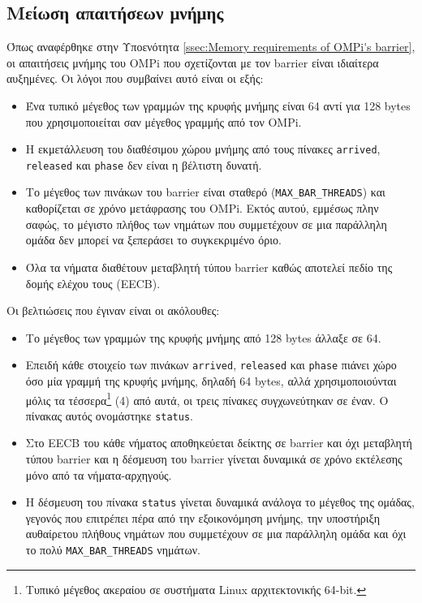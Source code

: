 \subsection{Μείωση απαιτήσεων μνήμης}
Όπως αναφέρθηκε στην Υποενότητα \ref{ssec:Memory requirements of OMPi's barrier}, οι απαιτήσεις μνήμης του OMPi που σχετίζονται με τον barrier είναι ιδιαίτερα αυξημένες. Οι λόγοι που συμβαίνει αυτό είναι οι εξής:
\begin{itemize}
	\item Ένα τυπικό μέγεθος των γραμμών της κρυφής μνήμης είναι 64 αντί για 128 bytes που χρησιμοποιείται σαν μέγεθος γραμμής από τον OMPi.
	\item Η εκμετάλλευση του διαθέσιμου χώρου μνήμης από τους πίνακες \texttt{arrived}, \texttt{released} και \texttt{phase} δεν είναι η βέλτιστη δυνατή.
	\item Το μέγεθος των πινάκων του barrier είναι σταθερό (\texttt{MAX\_BAR\_THREADS}) και καθορίζεται σε χρόνο μετάφρασης του OMPi. Εκτός αυτού, εμμέσως πλην σαφώς, το μέγιστο πλήθος των νημάτων που συμμετέχουν σε μια παράλληλη ομάδα δεν μπορεί να ξεπεράσει το συγκεκριμένο όριο. 
	\item Όλα τα νήματα διαθέτουν μεταβλητή τύπου barrier καθώς αποτελεί πεδίο της δομής ελέχου τους (EECB).
\end{itemize}

\noindent Οι βελτιώσεις που έγιναν είναι οι ακόλουθες:
\begin{itemize}
	\item Το μέγεθος των γραμμών της κρυφής μνήμης από 128 bytes άλλαξε σε 64.
	\item Επειδή κάθε στοιχείο των πινάκων \texttt{arrived}, \texttt{released} και \texttt{phase} πιάνει χώρο όσο μία γραμμή της κρυφής μνήμης, δηλαδή 64 bytes, αλλά χρησιμοποιούνται μόλις τα τέσσερα\footnote{Τυπικό μέγεθος ακεραίου σε συστήματα Linux αρχιτεκτονικής 64-bit.} (4) από αυτά, οι τρεις πίνακες συγχωνεύτηκαν σε έναν. Ο πίνακας αυτός ονομάστηκε \texttt{status}.
	\item Στο EECB του κάθε νήματος αποθηκεύεται δείκτης σε barrier και όχι μεταβλητή τύπου barrier και η δέσμευση του barrier γίνεται δυναμικά σε χρόνο εκτέλεσης μόνο από τα νήματα-αρχηγούς.
	\item Η δέσμευση του πίνακα \texttt{status} γίνεται δυναμικά ανάλογα το μέγεθος της ομάδας, γεγονός που επιτρέπει πέρα από την εξοικονόμηση μνήμης, την υποστήριξη αυθαίρετου πλήθους νημάτων που συμμετέχουν σε μια παράλληλη ομάδα και όχι το πολύ \texttt{MAX\_BAR\_THREADS} νημάτων.
\end{itemize}


